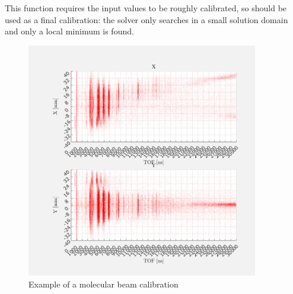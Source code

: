This function requires the input values to be roughly calibrated, so should be used as a final calibration: the solver only searches in a small solution domain and only a local minimum is found. 

\begin{figure}[H]
   \centering
    \centerline{\includegraphics[width=0.9\textwidth]{Graphics/MB_calib.png}}
\caption{Example of a molecular beam calibration}
\label{MB_calib}
\end{figure}
